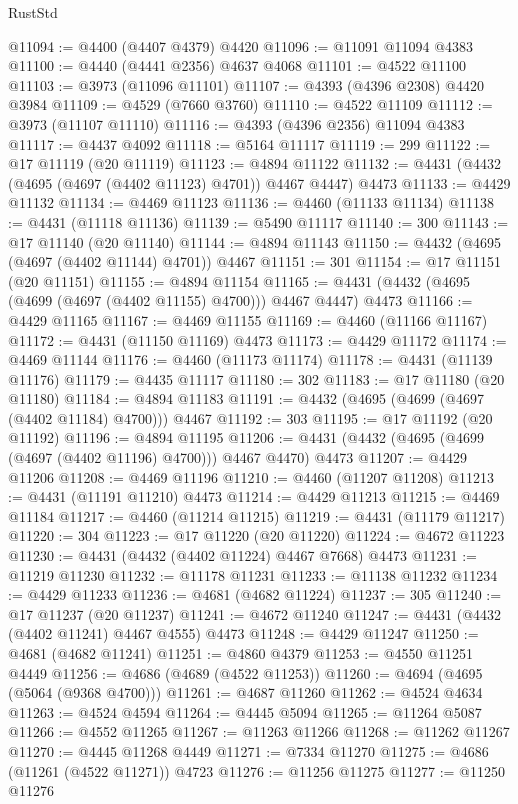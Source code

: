 \begin{lexlean}{RustStd}
\begin{coremodule}
@11094 := @4400 (@4407 @4379) @4420
@11096 := @11091 @11094 @4383
@11100 := @4440 (@4441 @2356) @4637 @4068
@11101 := @4522 @11100
@11103 := @3973 (@11096 @11101)
@11107 := @4393 (@4396 @2308) @4420 @3984
@11109 := @4529 (@7660 @3760)
@11110 := @4522 @11109
@11112 := @3973 (@11107 @11110)
@11116 := @4393 (@4396 @2356) @11094 @4383
@11117 := @4437 @4092
@11118 := @5164 @11117
@11119 := 299
@11122 := @17 @11119 (@20 @11119)
@11123 := @4894 @11122
@11132 := @4431 (@4432 (@4695 (@4697 (@4402 @11123) @4701)) @4467 @4447) @4473
@11133 := @4429 @11132
@11134 := @4469 @11123
@11136 := @4460 (@11133 @11134)
@11138 := @4431 (@11118 @11136)
@11139 := @5490 @11117
@11140 := 300
@11143 := @17 @11140 (@20 @11140)
@11144 := @4894 @11143
@11150 := @4432 (@4695 (@4697 (@4402 @11144) @4701)) @4467
@11151 := 301
@11154 := @17 @11151 (@20 @11151)
@11155 := @4894 @11154
@11165 := @4431 (@4432 (@4695 (@4699 (@4697 (@4402 @11155) @4700))) @4467 @4447) @4473
@11166 := @4429 @11165
@11167 := @4469 @11155
@11169 := @4460 (@11166 @11167)
@11172 := @4431 (@11150 @11169) @4473
@11173 := @4429 @11172
@11174 := @4469 @11144
@11176 := @4460 (@11173 @11174)
@11178 := @4431 (@11139 @11176)
@11179 := @4435 @11117
@11180 := 302
@11183 := @17 @11180 (@20 @11180)
@11184 := @4894 @11183
@11191 := @4432 (@4695 (@4699 (@4697 (@4402 @11184) @4700))) @4467
@11192 := 303
@11195 := @17 @11192 (@20 @11192)
@11196 := @4894 @11195
@11206 := @4431 (@4432 (@4695 (@4699 (@4697 (@4402 @11196) @4700))) @4467 @4470) @4473
@11207 := @4429 @11206
@11208 := @4469 @11196
@11210 := @4460 (@11207 @11208)
@11213 := @4431 (@11191 @11210) @4473
@11214 := @4429 @11213
@11215 := @4469 @11184
@11217 := @4460 (@11214 @11215)
@11219 := @4431 (@11179 @11217)
@11220 := 304
@11223 := @17 @11220 (@20 @11220)
@11224 := @4672 @11223
@11230 := @4431 (@4432 (@4402 @11224) @4467 @7668) @4473
@11231 := @11219 @11230
@11232 := @11178 @11231
@11233 := @11138 @11232
@11234 := @4429 @11233
@11236 := @4681 (@4682 @11224)
@11237 := 305
@11240 := @17 @11237 (@20 @11237)
@11241 := @4672 @11240
@11247 := @4431 (@4432 (@4402 @11241) @4467 @4555) @4473
@11248 := @4429 @11247
@11250 := @4681 (@4682 @11241)
@11251 := @4860 @4379
@11253 := @4550 @11251 @4449
@11256 := @4686 (@4689 (@4522 @11253))
@11260 := @4694 (@4695 (@5064 (@9368 @4700)))
@11261 := @4687 @11260
@11262 := @4524 @4634
@11263 := @4524 @4594
@11264 := @4445 @5094
@11265 := @11264 @5087
@11266 := @4552 @11265
@11267 := @11263 @11266
@11268 := @11262 @11267
@11270 := @4445 @11268 @4449
@11271 := @7334 @11270
@11275 := @4686 (@11261 (@4522 @11271)) @4723
@11276 := @11256 @11275
@11277 := @11250 @11276

\end{coremodule}
\end{lexlean}
